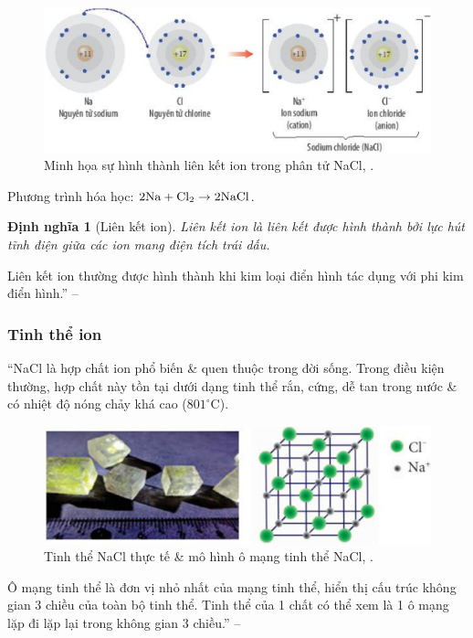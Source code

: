 \documentclass{article}
\numberwithin{equation}{section}
\newtheorem{dinhnghia}{Định nghĩa}[section]
\begin{document}
\begin{figure}[h]
	\centering
	\includegraphics[scale=0.15]{su_hinh_thanh_lien_ket_ion_trong_NaCl}
	\caption{Minh họa sự hình thành liên kết ion trong phân tử NaCl, \cite[Hình 9.2, p. 56]{SGK_Hoa_Hoc_10_Chan_Troi_Sang_Tao}.}
\end{figure}
Phương trình hóa học: $\rm 2Na + Cl_2\to 2NaCl$.

\begin{dinhnghia}[Liên kết ion]
	\emph{Liên kết ion} là liên kết được hình thành bởi lực hút tĩnh điện giữa các ion mang điện tích trái dấu.
\end{dinhnghia}
Liên kết ion thường được hình thành khi kim loại điển hình tác dụng với phi kim điển hình.'' -- \cite[p. 56]{SGK_Hoa_Hoc_10_Chan_Troi_Sang_Tao}

\subsubsection{Tinh thể ion}
``NaCl là hợp chất ion phổ biến \& quen thuộc trong đời sống. Trong điều kiện thường, hợp chất này tồn tại dưới dạng tinh thể rắn, cứng, dễ tan trong nước \& có nhiệt độ nóng chảy khá cao ($801^\circ$C).

\begin{figure}[h]
	\centering
	\includegraphics[scale=0.15]{tinh_the_NaCl}
	\caption{Tinh thể NaCl thực tế \& mô hình ô mạng tinh thể NaCl, \cite[Hình 9.3, p. 56]{SGK_Hoa_Hoc_10_Chan_Troi_Sang_Tao}.}
\end{figure}
Ô mạng tinh thể là đơn vị nhỏ nhất của mạng tinh thể, hiển thị cấu trúc không gian 3 chiều của toàn bộ tinh thể. Tinh thể của 1 chất có thể xem là 1 ô mạng lặp đi lặp lại trong không gian 3 chiều.'' -- \cite[p. 56]{SGK_Hoa_Hoc_10_Chan_Troi_Sang_Tao}
\end{document}
